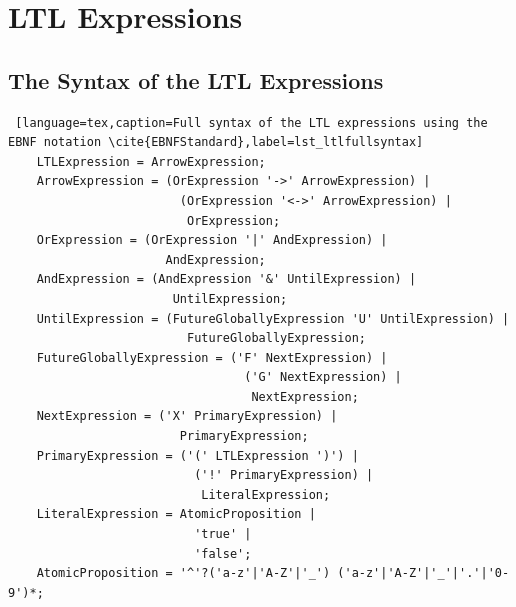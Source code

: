 \appendix

\chapter{LTL Expressions}

\section{The Syntax of the LTL Expressions}
\begin{lstlisting} [language=tex,caption=Full syntax of the LTL expressions using the EBNF notation \cite{EBNFStandard},label=lst_ltlfullsyntax]
	LTLExpression = ArrowExpression;
	ArrowExpression = (OrExpression '->' ArrowExpression) |
	                    (OrExpression '<->' ArrowExpression) |
	                     OrExpression;
	OrExpression = (OrExpression '|' AndExpression) |
	                  AndExpression;
	AndExpression = (AndExpression '&' UntilExpression) |
	                   UntilExpression;
	UntilExpression = (FutureGloballyExpression 'U' UntilExpression) |
	                     FutureGloballyExpression;
	FutureGloballyExpression = ('F' NextExpression) |
	                             ('G' NextExpression) |
	                              NextExpression;
	NextExpression = ('X' PrimaryExpression) |
	                    PrimaryExpression;
	PrimaryExpression = ('(' LTLExpression ')') |
	                      ('!' PrimaryExpression) |
	                       LiteralExpression;
	LiteralExpression = AtomicProposition |
	                      'true' |
	                      'false';
	AtomicProposition = '^'?('a-z'|'A-Z'|'_') ('a-z'|'A-Z'|'_'|'.'|'0-9')*;		
\end{lstlisting}

